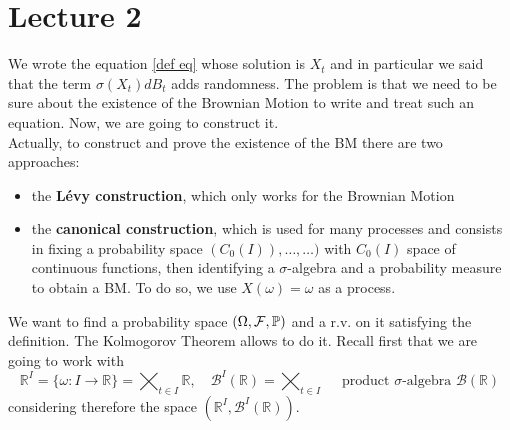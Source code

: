 \newpage

\section{Lecture 2}
We wrote the equation \eqref{def eq} whose solution is $X_t$ and in particular we said that the term $\sigma(X_t) dB_t$ adds randomness. The problem is that we need to be sure about the existence of the Brownian Motion to write and treat such an equation. Now, we are going to construct it. \\  
Actually, to construct and prove the existence of the BM there are two approaches:
\begin{itemize}
    \item the \textbf{Lévy construction}, which only works for the Brownian Motion
    \item the \textbf{canonical construction}, which is used for many processes and consists in fixing a probability space $(C_0(I)), \ldots, \ldots)$ with $C_0(I)$ space of continuous functions, then identifying a $\sigma$-algebra and a probability measure to obtain a BM. To do so, we use $X(\omega) = \omega$ as a process.
\end{itemize}
We want to find a probability space $(\Omega, \mathcal{F}, \mathbb{P})$ and a r.v. on it satisfying the definition. The Kolmogorov Theorem allows to do it. Recall first that we are going to work with 
\begin{equation*}
    \mathbb{R}^I = \{\omega: I \to \mathbb{R}\} = \bigtimes _{t \in I} \mathbb{R}, \quad \mathcal{B}^I(\mathbb{R}) = \bigtimes_{t \in I} \quad \text{ product $\sigma$-algebra }
 \mathcal{B}(\mathbb{R})
 \end{equation*}
 considering therefore the space $(\mathbb{R}^I, \mathcal{B}^I(\mathbb{R}))$.
